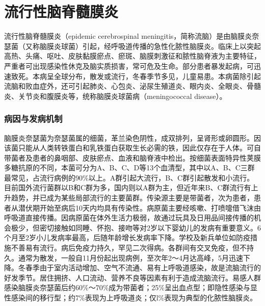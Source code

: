 \chapter{流行性脑脊髓膜炎}

流行性脑脊髓膜炎（epidemic cerebrospinal
meningitis，简称流脑）是由脑膜炎奈瑟菌（又称脑膜炎球菌）引起，经呼吸道传播的急性化脓性脑膜炎。临床上以突起高热、头痛、呕吐、皮肤黏膜瘀点、瘀斑、脑膜刺激征和脓性脑脊液为主要特征，严重者可出现感染性休克及脑实质损害，常可危及生命。部分患者暴发起病，可迅速致死。本病呈全球分布，散发或流行，冬春季节多见，儿童易患。本病菌除引起流脑和败血症外，还可引起肺炎、心包炎、泌尿生殖道炎、眼内炎、全眼炎、骨髓炎、关节炎和腹膜炎等，统称脑膜炎球菌病（meningococcal
disease）。

\subsection{病因与发病机制}

脑膜炎奈瑟菌为奈瑟菌属的细菌，革兰染色阴性，成双排列，呈肾形或卵圆形。因该菌只能从人类转铁蛋白和乳铁蛋白获取生长必需的铁，因此仅存在于人体。可自带菌者及患者的鼻咽部、皮肤瘀点、血液和脑脊液中检出。按细菌表面特异性荚膜多糖抗原的不同，本菌可分为A、B、C、D等13个血清型，其中以A、B、C三群最常见，占流行病例的90\%以上。A群引起大流行，B、C群引起散发和小流行。目前国外流行菌群以B和C群为多，国内则以A群为主，但近年来B、C群流行有上升趋势，并已成为某些局部流行的主要菌群。传染源主要是带菌者，次为患者，患者从潜伏期开始至病后10天内均具有传染性。病原菌主要经咳嗽、打喷嚏借飞沫由呼吸道直接传播。因病原菌在体外生活力极弱，故通过玩具及日用品间接传播的机会极少，但密切接触如同睡、怀抱、接吻等对2岁以下婴幼儿的发病有重要意义。6个月至2岁小儿发病率最高，后随年龄增长发病率下降。学校及新兵单位如防疫措施不善易有流行。病后免疫力持久，罕见二次得病。各群间有交叉免疫，但不持久。通常为散发，一般自11月份起出现病例，至次年2～4月达高峰，5月迅速下降。冬春季由于室内活动增加、空气不流通、易有上呼吸道感染，故是流脑流行的好发季节。居住拥挤、人口流动、营养不良等因素有利于造成流脑流行。易感人群感染脑膜炎奈瑟菌后约60\%～70\%成为带菌者；25\%呈出血点型；即隐性感染与显性感染间的移行型；约7\%表现为上呼吸道炎；仅l\%表现为典型的化脓性脑膜炎。

